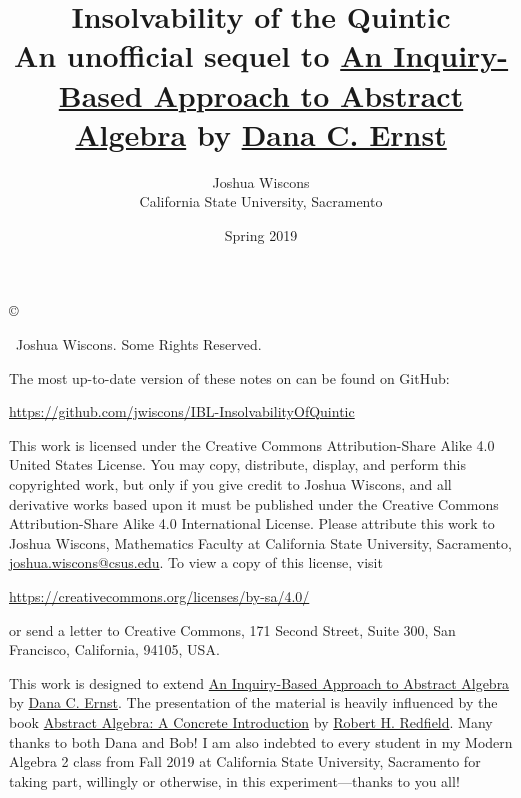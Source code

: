 \documentclass[12pt,oneside]{book}
\theoremstyle{definition}
\begin{document}
\title{Insolvability of the Quintic\\ {\small \normalfont An unofficial sequel to \href{https://github.com/dcernst/IBL-AbstractAlgebra}{An Inquiry-Based Approach to Abstract Algebra} by \href{http://danaernst.com}{Dana C. Ernst}}}
\author{Joshua Wiscons\\
California State University, Sacramento}
\date{Spring 2019}

\maketitle

\noindent\copyright{ \the\year\ Joshua Wiscons.  Some Rights Reserved.\\

\bigskip

\noindent The most up-to-date version of these notes on can be found on GitHub:
\begin{center}
\url{https://github.com/jwiscons/IBL-InsolvabilityOfQuintic}
\end{center}

\bigskip

\noindent This work is licensed under the Creative Commons Attribution-Share Alike 4.0 United States License.  You may copy, distribute, display, and perform this copyrighted work, but only if you give credit to Joshua Wiscons, and all derivative works based upon it must be published under the Creative Commons Attribution-Share Alike 4.0 International License. Please attribute this work to Joshua Wiscons, Mathematics Faculty at California State University, Sacramento, \url{joshua.wiscons@csus.edu}. To view a copy of this license, visit
\begin{center}
\url{https://creativecommons.org/licenses/by-sa/4.0/}
\end{center}
or send a letter to Creative Commons, 171 Second Street, Suite 300, San Francisco, California, 94105, USA.}

\medskip

\begin{center}
\ccbysa
\end{center}

\noindent This work is designed to extend \href{https://github.com/dcernst/IBL-AbstractAlgebra}{An Inquiry-Based Approach to Abstract Algebra} by \href{http://danaernst.com}{Dana C. Ernst}. The presentation of the material is heavily influenced by the book \href{https://www.amazon.com/Abstract-Algebra-Introduction-Robert-Redfield/dp/020143721X}{Abstract Algebra: A Concrete Introduction} by \href{https://www.hamilton.edu/academics/our-faculty/directory/faculty-detail/robert-redfield}{Robert H. Redfield}. Many thanks to both Dana and Bob! I am also indebted to every student in my Modern Algebra 2 class from Fall 2019 at California State University, Sacramento for taking part, willingly or otherwise, in this experiment---thanks to you all! 

\tableofcontents




\appendix

\end{document}
